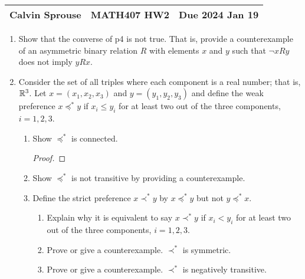 \documentclass[a4paper, 12pt]{config/homework}
\begin{document}
\noindent
\begin{tabularx}{\textwidth}{>{\centering\arraybackslash}X>{\centering\arraybackslash}X>{\centering\arraybackslash}X}
Calvin Sprouse & MATH407 HW2 & Due 2024 Jan 19\\
\midrule
\end{tabularx}

\begin{enumerate}
\item Show that the converse of p4 is not true. That is, provide a counterexample of an asymmetric binary relation \(R\) with elements \(x\) and \(y\) such that \(\neg xRy\) does not imply \(yRx\).

\item Consider the set of all triples where each component is a real number; that is, \(\mathbb{R}^3\). Let \(x=(x_1,x_2,x_3)\) and \(y=(y_1,y_2,y_3)\) and define the weak preference \(x \preccurlyeq^* y\) if \(x_i \le y_i\) for at least two out of the three components, \(i=1,2,3\).
\begin{enumerate}[label= (\alph*)]
\item Show \(\preccurlyeq^*\) is connected.
\begin{proof}

\end{proof}

\item Show \(\preccurlyeq^*\) is not transitive by providing a counterexample.

\item Define the strict preference \(x \prec^* y\) by \(x \preccurlyeq^* y\) but not \(y \preccurlyeq^* x\).
\begin{enumerate}[label= \roman*.]
\item Explain why it is equivalent to say \(x \prec^* y\) if \(x_i < y_i\) for at least two out of the three components, \(i=1,2,3\).

\item Prove or give a counterexample. \(\prec^*\) is symmetric.

\item Prove or give a counterexample. \(\prec^*\) is negatively transitive.

\end{enumerate}
\end{enumerate}
\end{enumerate}
\end{document}
